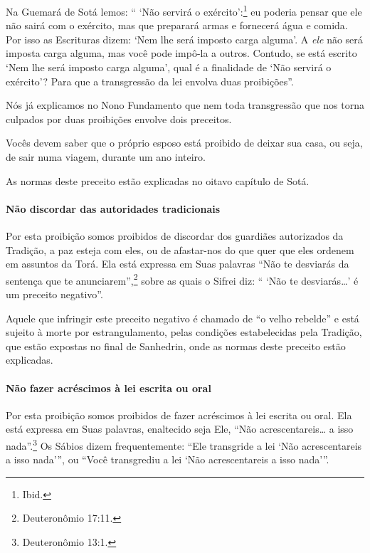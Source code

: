 Na Guemará de Sotá lemos: `` `Não servirá o exército':\footnote{Ibid.} eu
poderia pensar que ele não sairá com o exército, mas que preparará armas
e fornecerá água e comida. Por isso as Escrituras dizem: `Nem lhe será
imposto carga alguma'. A \emph{ele} não será imposta carga alguma, mas
você pode impô-la a outros. Contudo, se está escrito `Nem lhe será
imposto carga alguma', qual é a finalidade de `Não servirá o exército'?
Para que a transgressão da lei envolva duas proibições''.

Nós já explicamos no Nono Fundamento que nem toda transgressão que nos
torna culpados por duas proibições envolve dois preceitos.

Vocês devem saber que o próprio esposo está proibido de deixar sua casa,
ou seja, de sair numa viagem, durante um ano inteiro.

As normas deste preceito estão explicadas no oitavo capítulo de Sotá.

\paragraph{Não discordar das autoridades tradicionais}

Por esta proibição somos proibidos de discordar dos guardiães
autorizados da Tradição, a paz esteja com eles, ou de afastar-nos do que
quer que eles ordenem em assuntos da Torá. Ela está expressa em Suas
palavras ``Não te desviarás da sentença que te anunciarem'',\footnote{Deuteronômio 17:11.} sobre as quais o Sifrei diz: `` `Não te
desviarás\ldots{}' é um preceito negativo''.

Aquele que infringir este preceito negativo é chamado de ``o velho
rebelde'' e está sujeito à morte por estrangulamento, pelas condições
estabelecidas pela Tradição, que estão expostas no final de Sanhedrin,
onde as normas deste preceito estão explicadas.

\paragraph{Não fazer acréscimos à lei escrita ou oral}

Por esta proibição somos proibidos de fazer acréscimos à lei escrita ou
oral. Ela está expressa em Suas palavras, enaltecido seja Ele, ``Não
acrescentareis\ldots{} a isso nada''.\footnote{Deuteronômio 13:1.} Os Sábios dizem
frequentemente: ``Ele transgride a lei `Não acrescentareis a isso
nada''', ou ``Você transgrediu a lei `Não acrescentareis a isso nada'''.

